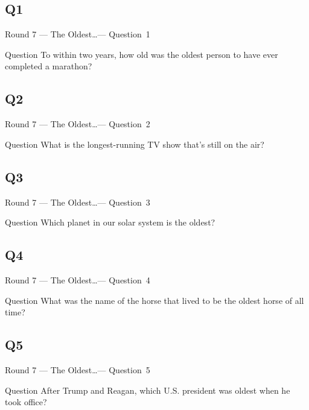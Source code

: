 \documentclass[11pt]{beamer}
\begin{document}
\subsection*{Q1}
\begin{frame}[t]{Round 7 --- The Oldest\ldots --- \mbox{Question 1}}
\vspace{-0.5em}
\begin{block}{Question}
To within two years, how old was the oldest person to have ever completed a marathon?
\end{block}
\end{frame}
\subsection*{Q2}
\begin{frame}[t]{Round 7 --- The Oldest\ldots --- \mbox{Question 2}}
\vspace{-0.5em}
\begin{block}{Question}
What is the longest-running TV show that's still on the air?
\end{block}
\end{frame}
\subsection*{Q3}
\begin{frame}[t]{Round 7 --- The Oldest\ldots --- \mbox{Question 3}}
\vspace{-0.5em}
\begin{block}{Question}
Which planet in our solar system is the oldest?
\end{block}
\end{frame}
\subsection*{Q4}
\begin{frame}[t]{Round 7 --- The Oldest\ldots --- \mbox{Question 4}}
\vspace{-0.5em}
\begin{block}{Question}
What was the name of the horse that lived to be the oldest horse of all time?
\end{block}
\end{frame}
\subsection*{Q5}
\begin{frame}[t]{Round 7 --- The Oldest\ldots --- \mbox{Question 5}}
\vspace{-0.5em}
\begin{block}{Question}
After Trump and Reagan, which U.S. president was oldest when he took office?
\end{block}
\end{frame}
\end{document}
